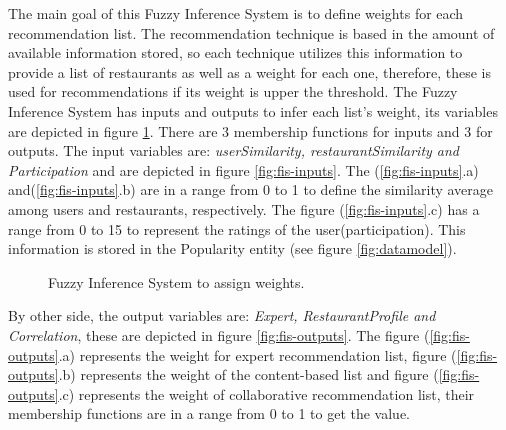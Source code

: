 The main goal of this Fuzzy Inference System is to define weights for
each recommendation list. The recommendation technique is based in the
amount of available information stored, so each technique utilizes
this information to provide a list of restaurants as well as a weight
for each one, therefore, these is used for  recommendations if its
weight is upper the threshold.  The Fuzzy Inference System has inputs
and outputs to infer each list's weight, its variables are depicted in
figure \ref{fig:fis-pesos}.  There are 3 membership functions for
inputs and 3 for outputs. The input variables are:
\textit{userSimilarity, restaurantSimilarity and Participation} and
are depicted in figure \ref{fig:fis-inputs}. The (\ref{fig:fis-inputs}.a) 
and(\ref{fig:fis-inputs}.b) are in a range from 0 to 1 to
define the similarity average among users and restaurants,
respectively. The figure (\ref{fig:fis-inputs}.c) has a range from 0
to 15  to represent the ratings of the user(participation). This
information is stored in the Popularity entity (see figure
\ref{fig:datamodel}). \\
\begin{figure}
\captionsetup{justification=centering,margin=2cm,font=footnotesize}
\centering
{}
\caption{Fuzzy Inference System to assign weights.}
\label{fig:fis-pesos}       
\end{figure}
By other side, the output variables are: \textit{Expert,
RestaurantProfile and Correlation}, these are depicted in figure
\ref{fig:fis-outputs}. The figure (\ref{fig:fis-outputs}.a) represents
the weight for expert recommendation list, figure (\ref{fig:fis-outputs}.b) 
represents the weight of the content-based list and figure
(\ref{fig:fis-outputs}.c) represents the weight of collaborative
recommendation list, their membership functions are in a range from 0
to 1 to get the value.
